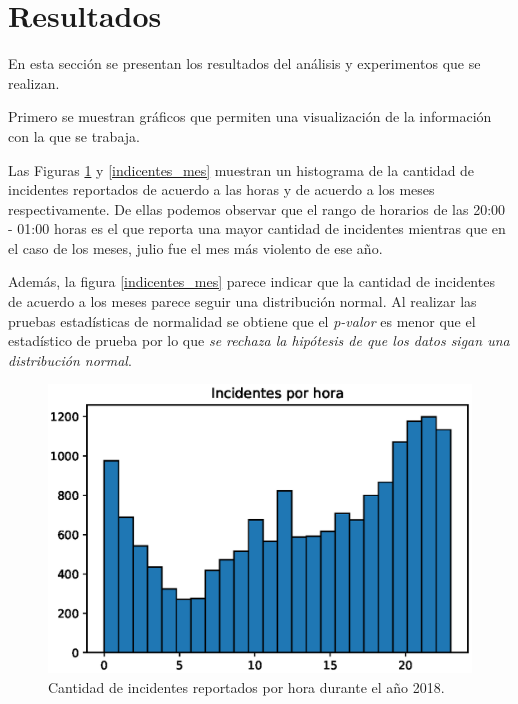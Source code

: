 \documentclass[final,5p,times]{elsarticle}
\begin{document}
\section{Resultados} \label{resultados}

En esta secci\'on se presentan los resultados del an\'alisis y experimentos que se realizan.

Primero se muestran gr\'aficos que permiten una visualizaci\'on de la informaci\'on con la que se trabaja. 

Las Figuras \ref{incidentes_horas} y \ref{indicentes_mes} muestran un histograma de la cantidad de incidentes reportados de acuerdo a las horas y de acuerdo a los meses respectivamente. De ellas podemos observar que el rango de horarios de las 20:00 - 01:00 horas es el que reporta una mayor cantidad de incidentes mientras que en el caso de los meses, julio fue el mes m\'as violento de ese a\~no.

Adem\'as, la figura \ref{indicentes_mes} parece indicar que la cantidad de incidentes de acuerdo a los meses parece seguir una distribuci\'on normal. Al realizar las pruebas estad\'isticas de normalidad se obtiene que el \textit{p-valor} es menor que el estad\'istico de prueba por lo que \textit{se rechaza la hip\'otesis de que los datos sigan una distribuci\'on normal}.   

\begin{figure}
\centering
\includegraphics[scale=0.6]{horas.eps}
\caption{Cantidad de incidentes reportados por hora durante el a\~no 2018.}
\label{incidentes_horas}
\end{figure} 
\end{document}
